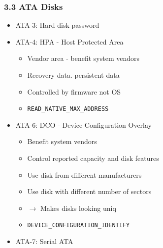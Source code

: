 \begin{frame}[fragile]
  \frametitle{3.3 ATA Disks }
    \begin{itemize}
        \item ATA-3: Hard disk password
        \item ATA-4: HPA - Host Protected Area
        \begin{itemize}
            \item Vendor area - benefit system vendors
            \item Recovery data. persistent data
            \item Controlled by firmware not OS
            \item \texttt{READ\_NATIVE\_MAX\_ADDRESS}
        \end{itemize}
        \item ATA-6: DCO - Device Configuration Overlay
        \begin{itemize}
            \item Benefit system vendors
            \item Control reported capacity and disk features
            \item Use disk from different manufacturers
            \item Use disk with different number of sectors
            \item[] $\to$ Makes disks looking uniq
            \item \texttt{DEVICE\_CONFIGURATION\_IDENTIFY}
        \end{itemize}
        \item ATA-7: Serial ATA
    \end{itemize}
\end{frame}


